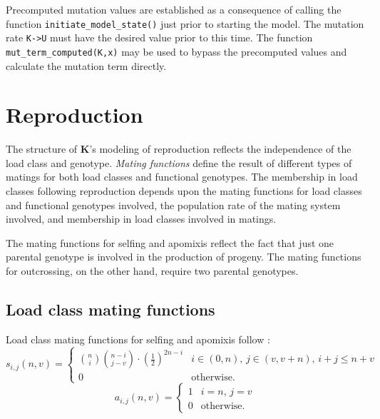 \documentclass[12pt,twoside,letterpaper,fleqn]{report}
\numberwithin{equation}{section}  %
\newcommand{\K}{{\bf K}}
\newcommand{\funcself}{\mbox{$s_{i,j}(n,v)$}}
\newcommand{\funcapomixis}{\mbox{$a_{i,j}(n,v)$}}
\begin{document}
{\sloppy Precomputed mutation values are established as a consequence of calling the function \lstinline{initiate_model_state()} just prior to starting the model.  The mutation rate \lstinline{K->U} must have the desired value prior to this time.  The function \lstinline{mut_term_computed(K,x)} may be used to bypass the precomputed values and calculate the mutation term directly.

\chapter{Reproduction}
\label{chapter:Kreproduction}

The structure of \K's modeling of reproduction reflects the independence of the load class and genotype.  {\em Mating functions} define the result of different types of matings for both load classes and functional genotypes.  The membership in load classes following reproduction depends upon the mating functions for load classes and functional genotypes involved, the population rate of the mating system involved, and membership in load classes involved in matings.

The mating functions for selfing and apomixis reflect the fact that just one parental genotype is involved in the production of progeny.  The mating functions for outcrossing, on the other hand, require two parental genotypes.

\section{Load class mating functions}

Load class mating functions for selfing and apomixis follow \citet{Kondrashov:1985:5375}:
\begin{equation}
\label{eq:Kreproduction:s}
\funcself =
    \begin{cases}
        \binom{n}{i}\binom{n-i}{j-v}\cdot\left({\frac{1}{2}}\right)^{2n-i} & \text{$i\in(0,n)$, $j\in(v,v + n)$, $i+j \leq n+v$} \\
        0                                                                  & \text{otherwise.} 
    \end{cases}
\end{equation}
\begin{equation}
\label{eq:Kreproduction:a}
\funcapomixis = 
    \begin{cases}
        1  &  \text{$i=n$, $j=v$} \\
        0  &  \text{otherwise.}  
    \end{cases}
\end{equation}

}
\end{document}
